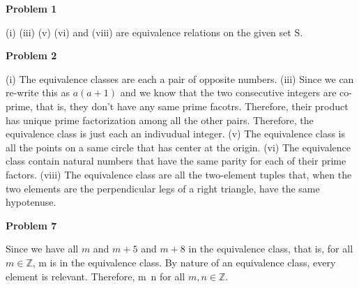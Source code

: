 \documentclass[12pt,letterpaper]{hmcpset}
\begin{document}
\begin{problem}
	\textbf{Problem 1}
\end{problem}

\begin{solution} (i) (iii) (v) (vi) and (viii) are equivalence relations on the given set S.
\end{solution}

\begin{problem}
	\textbf{Problem 2}
\end{problem}

\begin{solution}
	(i) The equivalence classes are each a pair of opposite numbers.
	\newline
	\newline (iii) Since we can re-write this as $a(a + 1)$ and we know that the two consecutive integers are co-prime, that is, they don't have any same prime facotrs. Therefore, their product has unique prime factorization among all the other pairs. Therefore, the equivalence class is just each an indivudual integer.
	\newline
	\newline (v) The equivalence class is all the points on a same circle that has center at the origin.
	\newline
	\newline (vi) The equivalence class contain natural numbers that have the same parity for each of their prime factors.
	\newline
	\newline (viii) The equivalence class are all the two-element tuples that, when the two elements are the perpendicular legs of a right triangle, have the same hypotenuse.
\end{solution}

\begin{problem}
	\textbf{Problem 7}
\end{problem}

\begin{solution} Since we have all $m$ and $m + 5$ and $m + 8$ in the equivalence class, that is, for all $m\in\mathbb{Z}$, m is in the equivalence class. By nature of an equivalence class, every element is relevant. Therefore, m~n for all $m,n\in\mathbb{Z}$.
\end{solution}


\end{document}
